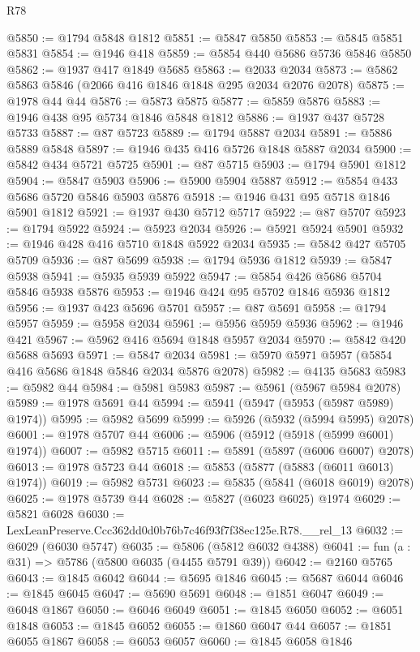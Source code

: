 \begin{lexlean}{R78}
\begin{coremodule}
@5850 := @1794 @5848 @1812
@5851 := @5847 @5850
@5853 := @5845 @5851 @5831
@5854 := @1946 @418
@5859 := @5854 @440 @5686 @5736 @5846 @5850
@5862 := @1937 @417 @1849 @5685
@5863 := @2033 @2034
@5873 := @5862 @5863 @5846 (@2066 @416 @1846 @1848 @295 @2034 @2076 @2078)
@5875 := @1978 @44 @44
@5876 := @5873 @5875
@5877 := @5859 @5876
@5883 := @1946 @438 @95 @5734 @1846 @5848 @1812
@5886 := @1937 @437 @5728 @5733
@5887 := @87 @5723
@5889 := @1794 @5887 @2034
@5891 := @5886 @5889 @5848
@5897 := @1946 @435 @416 @5726 @1848 @5887 @2034
@5900 := @5842 @434 @5721 @5725
@5901 := @87 @5715
@5903 := @1794 @5901 @1812
@5904 := @5847 @5903
@5906 := @5900 @5904 @5887
@5912 := @5854 @433 @5686 @5720 @5846 @5903 @5876
@5918 := @1946 @431 @95 @5718 @1846 @5901 @1812
@5921 := @1937 @430 @5712 @5717
@5922 := @87 @5707
@5923 := @1794 @5922
@5924 := @5923 @2034
@5926 := @5921 @5924 @5901
@5932 := @1946 @428 @416 @5710 @1848 @5922 @2034
@5935 := @5842 @427 @5705 @5709
@5936 := @87 @5699
@5938 := @1794 @5936 @1812
@5939 := @5847 @5938
@5941 := @5935 @5939 @5922
@5947 := @5854 @426 @5686 @5704 @5846 @5938 @5876
@5953 := @1946 @424 @95 @5702 @1846 @5936 @1812
@5956 := @1937 @423 @5696 @5701
@5957 := @87 @5691
@5958 := @1794 @5957
@5959 := @5958 @2034
@5961 := @5956 @5959 @5936
@5962 := @1946 @421
@5967 := @5962 @416 @5694 @1848 @5957 @2034
@5970 := @5842 @420 @5688 @5693
@5971 := @5847 @2034
@5981 := @5970 @5971 @5957 (@5854 @416 @5686 @1848 @5846 @2034 @5876 @2078)
@5982 := @4135 @5683
@5983 := @5982 @44
@5984 := @5981 @5983
@5987 := @5961 (@5967 @5984 @2078)
@5989 := @1978 @5691 @44
@5994 := @5941 (@5947 (@5953 (@5987 @5989) @1974))
@5995 := @5982 @5699
@5999 := @5926 (@5932 (@5994 @5995) @2078)
@6001 := @1978 @5707 @44
@6006 := @5906 (@5912 (@5918 (@5999 @6001) @1974))
@6007 := @5982 @5715
@6011 := @5891 (@5897 (@6006 @6007) @2078)
@6013 := @1978 @5723 @44
@6018 := @5853 (@5877 (@5883 (@6011 @6013) @1974))
@6019 := @5982 @5731
@6023 := @5835 (@5841 (@6018 @6019) @2078)
@6025 := @1978 @5739 @44
@6028 := @5827 (@6023 @6025) @1974
@6029 := @5821 @6028
@6030 := LexLeanPreserve.Ccc362dd0d0b76b7c46f93f7f38ec125e.R78.__rel_13
@6032 := @6029 (@6030 @5747)
@6035 := @5806 (@5812 @6032 @4388)
@6041 := fun (a : @31) => @5786 (@5800 @6035 (@4455 @5791 @39))
@6042 := @2160 @5765
@6043 := @1845 @6042
@6044 := @5695 @1846
@6045 := @5687 @6044
@6046 := @1845 @6045
@6047 := @5690 @5691
@6048 := @1851 @6047
@6049 := @6048 @1867
@6050 := @6046 @6049
@6051 := @1845 @6050
@6052 := @6051 @1848
@6053 := @1845 @6052
@6055 := @1860 @6047 @44
@6057 := @1851 @6055 @1867
@6058 := @6053 @6057
@6060 := @1845 @6058 @1846

\end{coremodule}
\end{lexlean}
